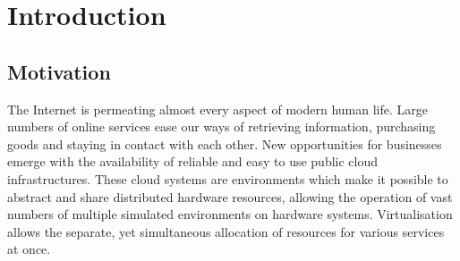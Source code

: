 \chapter{Introduction\label{cha:introduction}}


\section{Motivation\label{sec:motivation}}
The Internet is permeating almost every aspect of modern human life. Large numbers of online services ease our ways of retrieving information, purchasing goods and staying in contact with each other. New opportunities for businesses emerge with the availability of reliable and easy to use public cloud infrastructures. These cloud systems are environments which make it possible to abstract and share distributed hardware resources, allowing the operation of vast numbers of multiple simulated environments on hardware systems. Virtualisation allows the separate, yet simultaneous allocation of resources for various services at once.

